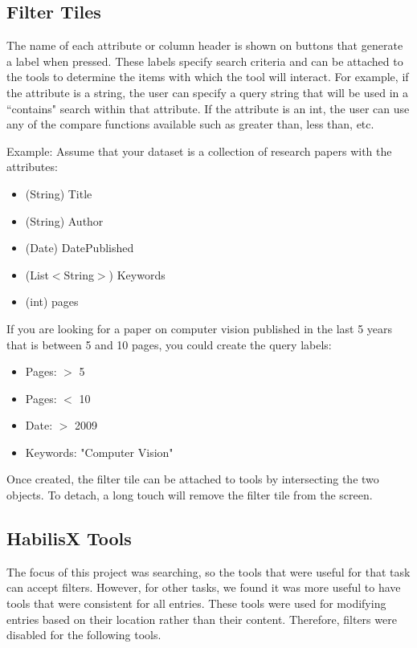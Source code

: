 \documentclass{article}
\begin{document}
\subsection{Filter Tiles}
The name of each attribute or column header is shown on buttons that generate a label when pressed. These labels specify search criteria and can be attached to the tools to determine the items with which the tool will interact. For example, if the attribute is a string, the user can specify a query string that will be used in a ``contains" search within that attribute. If the attribute is an int, the user can use any of the compare functions available such as greater than, less than, etc. 

Example: Assume that your dataset is a collection of research papers with the attributes: 
\begin{itemize}
\item{(String) Title }
\item{(String) Author }
\item{(Date) DatePublished}
\item{(List$<$String$>$) Keywords}
\item{(int) pages}

\end{itemize}

If you are looking for a paper on computer vision published in the last 5 years that is between 5 and 10 pages, you could create the query labels:
\begin{itemize}
\item Pages: $>$ 5
\item Pages: $<$ 10
\item Date: $>$ 2009
\item Keywords: "Computer Vision"
\end{itemize}

Once created, the filter tile can be attached to tools by intersecting the two objects.  To detach, a long touch will remove the filter tile from the screen.

\subsection{HabilisX Tools}
The focus of this project was searching, so the tools that were useful for that task can accept filters. However, for other tasks, we found it was more useful to have tools that were consistent for all entries.  These tools were used for modifying entries based on their location rather than their content.  Therefore, filters were disabled for the following tools.
\end{document}
